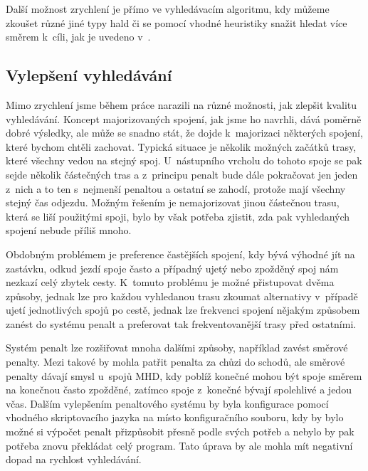 Další možnost zrychlení je přímo ve vyhledávacím algoritmu, kdy můžeme zkoušet
různé jiné typy hald či se pomocí vhodné heuristiky snažit hledat více směrem
k~cíli, jak je uvedeno v~\cite{mj-ga}.

\subsection{Vylepšení vyhledávání}
Mimo zrychlení jsme během práce narazili na různé možnosti, jak zlepšit kvalitu
vyhledávání. Koncept majorizovaných spojení, jak jsme ho navrhli, dává poměrně
dobré výsledky, ale může se snadno stát, že dojde k~majorizaci některých
spojení, které bychom chtěli zachovat. Typická situace je několik možných
začátků trasy, které všechny vedou na stejný spoj. U~nástupního vrcholu do
tohoto spoje se pak sejde několik částečných tras a z~principu penalt bude dále
pokračovat jen jeden z~nich a to ten s~nejmenší penaltou a ostatní se zahodí,
protože mají všechny stejný čas odjezdu. Možným řešením je nemajorizovat jinou
částečnou trasu, která se liší použitými spoji, bylo by však potřeba zjistit,
zda pak vyhledaných spojení nebude příliš mnoho.  

Obdobným problémem je preference častějších spojení, kdy bývá výhodné jít na
zastávku, odkud jezdí spoje často a případný ujetý nebo zpožděný spoj nám
nezkazí celý zbytek cesty. K~tomuto problému je možné přistupovat dvěma způsoby,
jednak lze pro každou vyhledanou trasu zkoumat alternativy v~případě ujetí
jednotlivých spojů po cestě, jednak lze frekvenci spojení nějakým způsobem
zanést do systému penalt a preferovat tak frekventovanější trasy před ostatními. 

Systém penalt lze rozšiřovat mnoha dalšími způsoby, například zavést směrové
penalty. Mezi takové by mohla patřit penalta za chůzi do schodů, ale směrové
penalty dávají smysl u~spojů MHD, kdy poblíž konečné mohou být spoje směrem na
konečnou často zpožděné, zatímco spoje z~konečné bývají spolehlivé a jedou včas.
Dalším vylepšením penaltového systému by byla konfigurace pomocí vhodného
skriptovacího jazyka na místo konfiguračního souboru, kdy by bylo možné si
výpočet penalt přizpůsobit přesně podle svých potřeb a nebylo by pak potřeba
znovu překládat celý program. Tato úprava by ale mohla mít negativní dopad na
rychlost vyhledávání.

